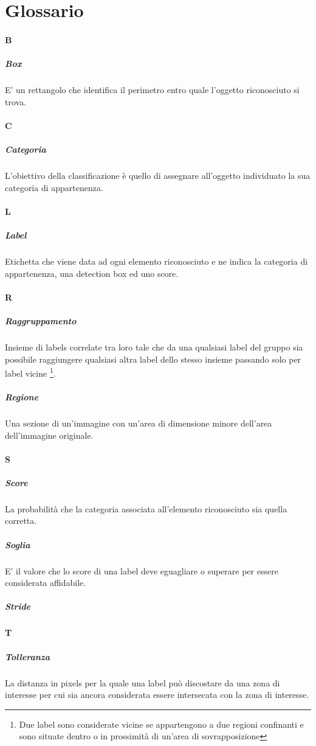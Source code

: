 \section{Glossario}

\paragraph{B}
\subparagraph{Box}
E' un rettangolo che identifica il perimetro entro quale l'oggetto riconosciuto si trova.

\paragraph{C}
\subparagraph{Categoria}
L'obiettivo della classificazione è quello di assegnare all'oggetto individuato la sua categoria di appartenenza.

\paragraph{L}
\subparagraph{Label}
Etichetta che viene data ad ogni elemento riconosciuto e ne indica la categoria di appartenenza, una detection box ed uno score.

\paragraph{R}
\subparagraph{Raggruppamento}
Insieme di labels correlate tra loro tale che da una qualsiasi label del gruppo sia possibile raggiungere qualsiasi altra label dello stesso insieme passando solo per label vicine \footnote{Due label sono considerate vicine se appartengono a due regioni confinanti e sono situate dentro o in prossimità di un'area di sovrapposizione}.
\subparagraph{Regione} Una sezione di un'immagine con un'area di dimensione minore dell'area dell'immagine originale.

\paragraph{S}
\subparagraph{Score} La probabilità che la categoria associata all'elemento riconosciuto sia quella corretta.
\subparagraph{Soglia} E' il valore che lo score di una label deve eguagliare o superare per essere considerata affidabile.
\subparagraph{Stride}

\paragraph{T}
\subparagraph{Tolleranza} La distanza in pixels per la quale una label può discostare da una zona di interesse per cui sia ancora considerata essere intersecata con la zona di interesse.
